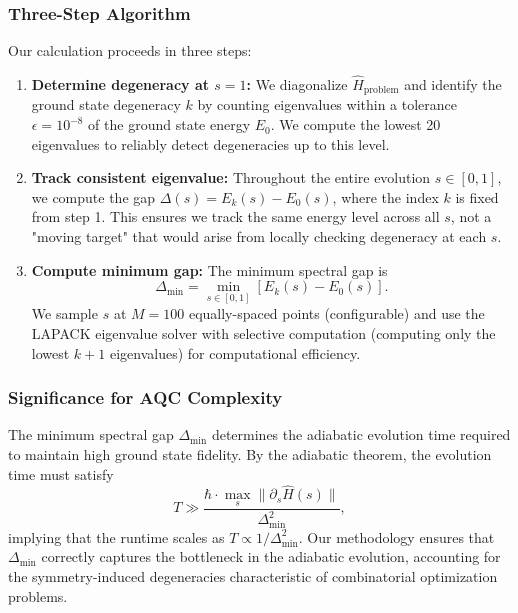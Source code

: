 \subsubsection{Three-Step Algorithm}

Our calculation proceeds in three steps:

\begin{enumerate}
    \item \textbf{Determine degeneracy at $s=1$:} We diagonalize $\hat{H}_{\text{problem}}$ and identify the ground state degeneracy $k$ by counting eigenvalues within a tolerance $\epsilon = 10^{-8}$ of the ground state energy $E_0$. We compute the lowest 20 eigenvalues to reliably detect degeneracies up to this level.
    
    \item \textbf{Track consistent eigenvalue:} Throughout the entire evolution $s \in [0,1]$, we compute the gap $\Delta(s) = E_k(s) - E_0(s)$, where the index $k$ is fixed from step 1. This ensures we track the same energy level across all $s$, not a "moving target" that would arise from locally checking degeneracy at each $s$.
    
    \item \textbf{Compute minimum gap:} The minimum spectral gap is
    \begin{equation}
        \Delta_{\text{min}} = \min_{s \in [0,1]} \left[ E_k(s) - E_0(s) \right].
    \end{equation}
    We sample $s$ at $M=100$ equally-spaced points (configurable) and use the LAPACK eigenvalue solver with selective computation (computing only the lowest $k+1$ eigenvalues) for computational efficiency.
\end{enumerate}

\subsubsection{Significance for AQC Complexity}

The minimum spectral gap $\Delta_{\text{min}}$ determines the adiabatic evolution time required to maintain high ground state fidelity. By the adiabatic theorem, the evolution time must satisfy
%
\begin{equation}
    T \gg \frac{\hbar \cdot \max_s \|\partial_s \hat{H}(s)\|}{\Delta_{\text{min}}^2},
\end{equation}
%
implying that the runtime scales as $T \propto 1/\Delta_{\text{min}}^2$. Our methodology ensures that $\Delta_{\text{min}}$ correctly captures the bottleneck in the adiabatic evolution, accounting for the symmetry-induced degeneracies characteristic of combinatorial optimization problems.

